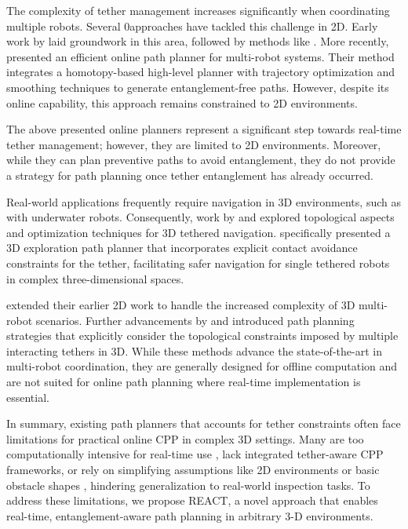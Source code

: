 The complexity of tether management increases significantly when coordinating multiple robots. Several 0approaches have tackled this challenge in 2D. Early work by \cite{hert1996ties} laid groundwork in this area, followed by methods like \cite{zhang2019planning}. More recently, \cite{cao2023neptune} presented an efficient online path planner for multi-robot systems. Their method integrates a homotopy-based high-level planner with trajectory optimization and smoothing techniques to generate entanglement-free paths. However, despite its online capability, this approach remains constrained to 2D environments. 

The above presented online planners represent a significant step towards real-time tether management; however, they are limited to 2D environments. Moreover, while they can plan preventive paths to avoid entanglement, they do not provide a strategy for path planning once tether entanglement has already occurred.

Real-world applications frequently require navigation in 3D environments, such as with underwater robots. Consequently, work by  \cite{bhattacharya2012topological} and \cite{martinez2021optimization} explored topological aspects and optimization techniques for 3D tethered navigation. \cite{petit2022tape} specifically presented a 3D exploration path planner that incorporates explicit contact avoidance constraints for the tether, facilitating safer navigation for single tethered robots in complex three-dimensional spaces.

 \cite{hert1999motion} extended their earlier 2D work to handle the increased complexity of 3D multi-robot scenarios. Further advancements by \cite{patil2023coordinating} and  \cite{cao2023path} introduced path planning strategies that explicitly consider the topological constraints imposed by multiple interacting tethers in 3D. While these methods advance the state-of-the-art in multi-robot coordination, they are generally designed for offline computation and are not suited for online path planning where real-time implementation is essential.

In summary, existing path planners that accounts for tether constraints often face limitations for practical online \ac{CPP} in complex 3D settings. Many are too computationally intensive for real-time use \cite{mechsy2017novel, hert1999motion, patil2023coordinating, cao2023path}, lack integrated tether-aware CPP frameworks, or rely on simplifying assumptions like 2D environments or basic obstacle shapes \cite{kim, withy, cao2023neptune}, hindering generalization to real-world inspection tasks.
To address these limitations, we propose \ac{REACT}, a novel approach that enables real-time, entanglement-aware path planning in arbitrary 3-D environments.


